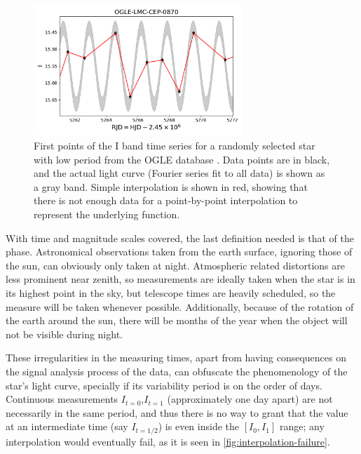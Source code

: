 	\begin{figure}
		\centering
		\includegraphics[width=0.7\textwidth]{img/interpolation_failure.pdf}
		\caption[Failure of interpolation of a light curve]{
			First points of the I band time series for a randomly selected star with low period from the OGLE database \citep{OGLE2016}.
			Data points are in black, and the actual light curve (Fourier series fit to all data) is shown as a gray band. 
			Simple interpolation is shown in red, showing that there is not enough data for a point-by-point interpolation to represent the underlying function.
		}
		\label{fig:interpolation-failure}
	\end{figure}

	With time and magnitude scales covered, the last definition needed is that of the phase. 
	Astronomical observations taken from the earth surface, ignoring those of the sun, can obviously only taken at night.
	Atmospheric related distortions are less prominent near zenith, 
	so measurements are ideally taken when the star is in its highest point in the sky,
	but telescope times are heavily scheduled, so the measure will be taken whenever possible.
	Additionally, because of the rotation of the earth around the sun, 
	there will be months of the year when the object will not be visible during night.
	
	These irregularities in the measuring times, apart from having consequences on the signal analysis process of the data,
	can obfuscate the phenomenology of the star's light curve, specially if its variability period is on the order of days.
	Continuous measurements $I_{t=0}$,$I_{t=1}$ (approximately one day apart) are not necessarily in the same period, 
	and thus there is no way to grant that the value at an intermediate time (say $I_{t=1/2}$) is even inside the $[I_0,I_1]$ range;
	any interpolation would eventually fail, as it is seen in \autoref{fig:interpolation-failure}.
	

